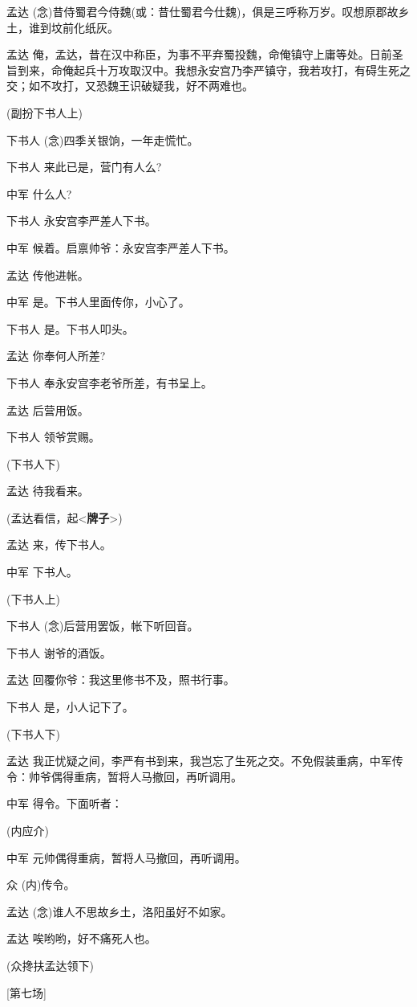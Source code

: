 孟达
(念)昔侍蜀君今侍魏(或：昔仕蜀君今仕魏)，俱是三呼称万岁。叹想原郡故乡土，谁到坟前化纸灰。

孟达
俺，孟达，昔在汉中称臣，为事不平弃蜀投魏，命俺镇守上庸等处。日前圣旨到来，命俺起兵十万攻取汉中。我想永安宫乃李严镇守，我若攻打，有碍生死之交；如不攻打，又恐魏王识破疑我，好不两难也。

(副扮下书人上)

下书人 (念)四季关银饷，一年走慌忙。

下书人 来此已是，营门有人么?

中军 什么人?

下书人 永安宫李严差人下书。

中军 候着。启禀帅爷：永安宫李严差人下书。

孟达 传他进帐。

中军 是。下书人里面传你，小心了。

下书人 是。下书人叩头。

孟达 你奉何人所差?

下书人 奉永安宫李老爷所差，有书呈上。

孟达 后营用饭。

下书人 领爷赏赐。

(下书人下)

孟达 待我看来。

(孟达看信，起\textless{}\textbf{牌子}\textgreater{})

孟达 来，传下书人。

中军 下书人。

(下书人上)

下书人 (念)后营用罢饭，帐下听回音。

下书人 谢爷的酒饭。

孟达 回覆你爷：我这里修书不及，照书行事。

下书人 是，小人记下了。

(下书人下)

孟达
我正忧疑之间，李严有书到来，我岂忘了生死之交。不免假装重病，中军传令：帅爷偶得重病，暂将人马撤回，再听调用。

中军 得令。下面听者：

(内应介)

中军 元帅偶得重病，暂将人马撤回，再听调用。

众 (内)传令。

孟达 (念)谁人不思故乡土，洛阳虽好不如家。

孟达 唉哟哟，好不痛死人也。

(众搀扶孟达领下)

{[}第七场{]}


